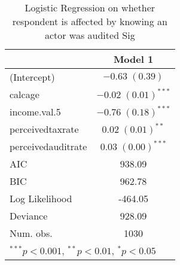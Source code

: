 
\begin{table}
\begin{tabular}{l c }
\hline
 & Model 1 \\
\hline
(Intercept)        & $-0.63 \; (0.39)$       \\
calcage            & $-0.02 \; (0.01)^{***}$ \\
income.val.5       & $-0.76 \; (0.18)^{***}$ \\
perceivedtaxrate   & $0.02 \; (0.01)^{**}$   \\
perceivedauditrate & $0.03 \; (0.00)^{***}$  \\
\hline
AIC                & 938.09                  \\
BIC                & 962.78                  \\
Log Likelihood     & -464.05                 \\
Deviance           & 928.09                  \\
Num. obs.          & 1030                    \\
\hline
\multicolumn{2}{l}{\scriptsize{$^{***}p<0.001$, $^{**}p<0.01$, $^*p<0.05$}}
\end{tabular}
\caption{Logistic Regression on whether respondent is affected by knowing an actor was audited Sig}
\label{table:coefficients}
\end{table}
